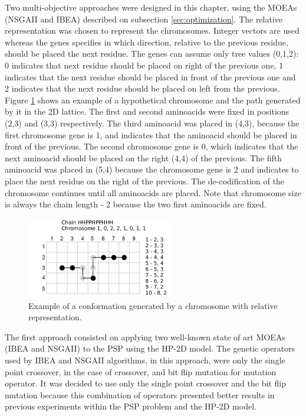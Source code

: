 Two multi-objective approaches were designed in this chapter, using the MOEAs (NSGAII and IBEA) described on subsection \ref{sec:optimization}. The relative representation was chosen to represent the chromosomes. Integer vectors are used whereas the genes specifies in which direction, relative to the previous residue, should be placed the next residue. The genes can assume only tree values (0,1,2): 0 indicates that next residue should be placed on right of the previous one, 1 indicates that the next residue should be placed in front of the previous one and 2 indicates that the next residue should be placed on left from the previous. Figure \ref{fig_sim} shows an example of a hypothetical chromosome and the path generated by it in the 2D lattice. The first and second aminoacids were fixed in positions (2,3) and (3,3) respectively. The third aminoacid was placed in (4,3), because the first chromosome gene is 1, and indicates that the aminoacid should be placed in front of the previous. The second chromosome gene is 0, which indicates that the next aminoacid should be placed on the right (4,4) of the previous. The fifth aminoacid was placed in (5,4) because the chromosome gene is 2 and indicates to place the next residue on the right of the previous. The de-codification of the chromosome continues until all aminoacids are placed. Note that chromosome size is always the chain length - 2 because the two first aminoacids are fixed.


\begin{figure}[ht]
	\centering
	\includegraphics[width=2.5in]{figures/figure3.png}
	\caption{Example of a conformation generated by a chromosome with relative representation.}
	\label{fig_sim}
\end{figure}


The first approach consisted on applying two well-known state of art MOEAs (IBEA and NSGAII) to the PSP using the HP-2D model. The genetic operators used by IBEA and NSGAII algorithms, in this approach, were only the single point crossover, in the case of crossover, and bit flip mutation for mutation operator. It was decided to use only the single point crossover and the bit flip mutation because this combination of operators presented better results in previous experiments within the PSP problem and the HP-2D model.

